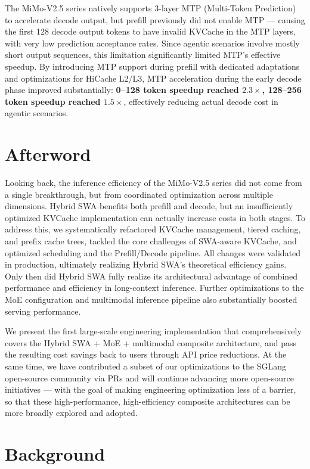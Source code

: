 The MiMo-V2.5 series natively supports 3-layer MTP (Multi-Token Prediction) to accelerate decode output, but prefill previously did not enable MTP --- causing the first 128 decode output tokens to have invalid KVCache in the MTP layers, with very low prediction acceptance rates. Since agentic scenarios involve mostly short output sequences, this limitation significantly limited MTP's effective speedup. By introducing MTP support during prefill with dedicated adaptations and optimizations for HiCache L2/L3, MTP acceleration during the early decode phase improved substantially: \textbf{0--128 token speedup reached $2.3\times$, 128--256 token speedup reached $1.5\times$}, effectively reducing actual decode cost in agentic scenarios.

\section{Afterword}

Looking back, the inference efficiency of the MiMo-V2.5 series did not come from a single breakthrough, but from coordinated optimization across multiple dimensions. Hybrid SWA benefits both prefill and decode, but an insufficiently optimized KVCache implementation can actually increase costs in both stages. To address this, we systematically refactored KVCache management, tiered caching, and prefix cache trees, tackled the core challenges of SWA-aware KVCache, and optimized scheduling and the Prefill/Decode pipeline. All changes were validated in production, ultimately realizing Hybrid SWA's theoretical efficiency gains. Only then did Hybrid SWA fully realize its architectural advantage of combined performance and efficiency in long-context inference. Further optimizations to the MoE configuration and multimodal inference pipeline also substantially boosted serving performance.

We present the first large-scale engineering implementation that comprehensively covers the Hybrid SWA + MoE + multimodal composite architecture, and pass the resulting cost savings back to users through API price reductions. At the same time, we have contributed a subset of our optimizations to the SGLang open-source community via PRs and will continue advancing more open-source initiatives --- with the goal of making engineering optimization less of a barrier, so that these high-performance, high-efficiency composite architectures can be more broadly explored and adopted.

\section{Background}

